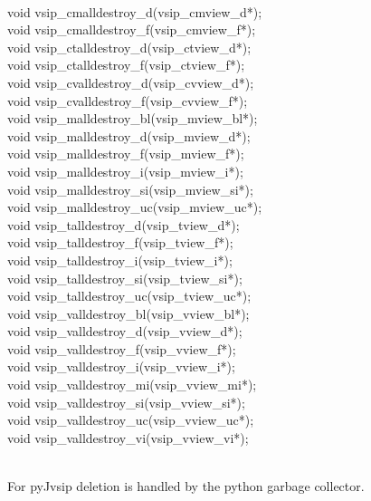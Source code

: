 \\\cvsiplh
\begin{cfuncs}
void vsip\_cmalldestroy\_d(vsip\_cmview\_d*);\\
void vsip\_cmalldestroy\_f(vsip\_cmview\_f*);\\
void vsip\_ctalldestroy\_d(vsip\_ctview\_d*);\\
void vsip\_ctalldestroy\_f(vsip\_ctview\_f*);\\
void vsip\_cvalldestroy\_d(vsip\_cvview\_d*);\\
void vsip\_cvalldestroy\_f(vsip\_cvview\_f*);\\
void vsip\_malldestroy\_bl(vsip\_mview\_bl*);\\
void vsip\_malldestroy\_d(vsip\_mview\_d*);\\
void vsip\_malldestroy\_f(vsip\_mview\_f*);\\
void vsip\_malldestroy\_i(vsip\_mview\_i*);\\
void vsip\_malldestroy\_si(vsip\_mview\_si*);\\
void vsip\_malldestroy\_uc(vsip\_mview\_uc*);\\
void vsip\_talldestroy\_d(vsip\_tview\_d*);\\
void vsip\_talldestroy\_f(vsip\_tview\_f*);\\
void vsip\_talldestroy\_i(vsip\_tview\_i*);\\
void vsip\_talldestroy\_si(vsip\_tview\_si*);\\
void vsip\_talldestroy\_uc(vsip\_tview\_uc*);\\
void vsip\_valldestroy\_bl(vsip\_vview\_bl*);\\
void vsip\_valldestroy\_d(vsip\_vview\_d*);\\
void vsip\_valldestroy\_f(vsip\_vview\_f*);\\
void vsip\_valldestroy\_i(vsip\_vview\_i*);\\
void vsip\_valldestroy\_mi(vsip\_vview\_mi*);\\
void vsip\_valldestroy\_si(vsip\_vview\_si*);\\
void vsip\_valldestroy\_uc(vsip\_vview\_uc*);\\
void vsip\_valldestroy\_vi(vsip\_vview\_vi*);\\
\end{cfuncs}
\pyjvsiph\\
\hspace*{1cm}For pyJvsip deletion is handled by the python garbage collector.
